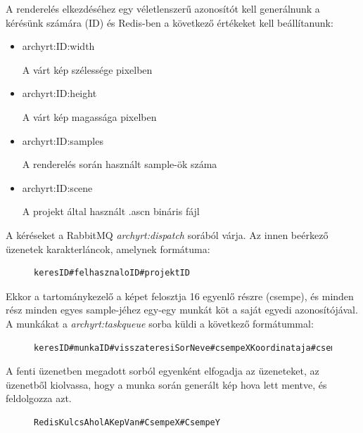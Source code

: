 A renderelés elkezdéséhez egy véletlenszerű azonosítót kell generálnunk a kérésünk számára (ID) és Redis-ben a következő értékeket kell beállítanunk:

\begin{itemize}
    \item archyrt:ID:width

          A várt kép szélessége pixelben
    \item archyrt:ID:height

          A várt kép magassága pixelben
    \item archyrt:ID:samples

          A renderelés során használt sample-ök száma
    \item archyrt:ID:scene

          A projekt által használt .ascn bináris fájl
\end{itemize}

A kéréseket a RabbitMQ \emph{archyrt:dispatch} sorából várja. Az innen beérkező üzenetek karakterláncok, amelynek formátuma:

\begin{figure}[H]
    \centering
    \begin{minipage}{.7\textwidth}
        \begin{lstlisting}
keresID#felhasznaloID#projektID
\end{lstlisting}
    \end{minipage}
\end{figure}

Ekkor a tartománykezelő a képet felosztja 16 egyenlő részre (csempe), és minden rész minden egyes sample-jéhez egy-egy munkát köt a saját egyedi azonosítójával. A munkákat a \emph{archyrt:taskqueue} sorba küldi a következő formátummal:

\begin{figure}[H]
    \centering
    \begin{minipage}{.7\textwidth}
        \begin{lstlisting}
keresID#munkaID#visszateresiSorNeve#csempeXKoordinataja#csempeYKoordinataja
        \end{lstlisting}
    \end{minipage}
\end{figure}


A fenti üzenetben megadott sorból egyenként elfogadja az üzeneteket, az üzenetből kiolvassa, hogy a munka során generált kép hova lett mentve, és feldolgozza azt.

\begin{figure}[H]
    \centering
    \begin{minipage}{.7\textwidth}
        \begin{lstlisting}
RedisKulcsAholAKepVan#CsempeX#CsempeY
        \end{lstlisting}
    \end{minipage}
\end{figure}

